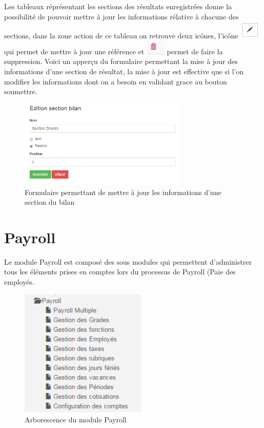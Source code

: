 \documentclass[12pt,a4paper]{report}
\begin{document}
\newpage
Les tableaux réprésentant les sections des résultats enregistrées donne la possibilité de pouvoir mettre à jour les informations rélative à chacune des sections, dans la zone action de ce tableau on retrouve deux icônes, l'icône \includegraphics[scale=0.7]{pic/EditBlack.png} qui permet de mettre à jour une référence et \includegraphics[scale=0.7]{pic/DeleteWRed.png} permet de faire la suppression.
Voici un apperçu du formulaire permettant la mise à jour des informations d'une section de résultat, la mise à jour est effective que si l'on modifier les informations dont on a besoin en validant grace au bouton soumettre. 

\begin{figure}[h]
\begin{center}
\includegraphics[width=8cm]{pic/EditSectBilan.png}
\end{center}
\caption{Formulaire permettant de mettre à jour les informations d'une section du bilan}
\label{Formulaire permettant de mettre à jour les informations d'une section du bilan}
\end{figure} 


\newpage
\chapter{Payroll}        
Le module Payroll est composé des sous modules qui permettent d'administrer tous les éléments prises en comptes lors du processus de Payroll (Paie des employés.

\begin{figure}[h]
\begin{center}
\includegraphics[width=6cm]{pic/PayrollArbo.png}
\end{center}
\caption{Arborescence du module Payroll}
\label{Arborescence du module Payroll}
\end{figure}
\end{document}
